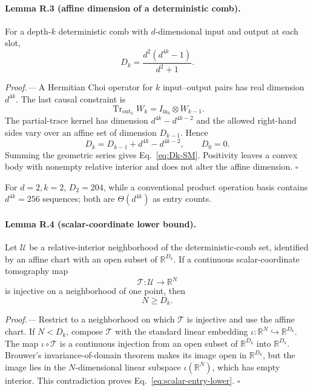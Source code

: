 \documentclass[aps,prl,onecolumn,superscriptaddress,nofootinbib]{revtex4-2}
\newcommand{\R}{\mathbb R}
\newcommand{\Tr}{\operatorname{Tr}}
\begin{document}
\paragraph{Lemma R.3 (affine dimension of a deterministic comb).}
For a depth-$k$ deterministic comb with $d$-dimensional input and output at each slot,
\begin{equation}
 D_k=\frac{d^2(d^{4k}-1)}{d^2+1}.
 \label{eq:Dk-SM}
\end{equation}

\emph{Proof.---}
A Hermitian Choi operator for $k$ input--output pairs has real dimension $d^{4k}$.  The last causal constraint is
\begin{equation}
 \Tr_{\mathrm{out}_k}W_k=I_{\mathrm{in}_k}\otimes W_{k-1}.
 \label{eq:comb-causal}
\end{equation}
The partial-trace kernel has dimension $d^{4k}-d^{4k-2}$ and the allowed right-hand sides vary over an affine set of dimension $D_{k-1}$.  Hence
\begin{equation}
 D_k=D_{k-1}+d^{4k}-d^{4k-2},
 \qquad D_0=0.
 \label{eq:Drecurrence}
\end{equation}
Summing the geometric series gives Eq.~\eqref{eq:Dk-SM}.  Positivity leaves a convex body with nonempty relative interior and does not alter the affine dimension. \hfill$\square$

For $d=2,k=2$, $D_2=204$, while a conventional product operation basis contains $d^{4k}=256$ sequences; both are $\Theta(d^{4k})$ as entry counts.

\paragraph{Lemma R.4 (scalar-coordinate lower bound).}
Let $\mathcal U$ be a relative-interior neighborhood of the deterministic-comb set, identified by an affine chart with an open subset of $\R^{D_k}$.  If a continuous scalar-coordinate tomography map
\begin{equation}
 \mathcal T:\mathcal U\longrightarrow\R^N
 \label{eq:scalar-tomography-map}
\end{equation}
is injective on a neighborhood of one point, then
\begin{equation}
 N\ge D_k.
 \label{eq:scalar-entry-lower}
\end{equation}

\emph{Proof.---}
Restrict to a neighborhood on which $\mathcal T$ is injective and use the affine chart.  If $N<D_k$, compose $\mathcal T$ with the standard linear embedding $\iota:\R^N\hookrightarrow\R^{D_k}$.  The map $\iota\circ\mathcal T$ is a continuous injection from an open subset of $\R^{D_k}$ into $\R^{D_k}$.  Brouwer's invariance-of-domain theorem makes its image open in $\R^{D_k}$, but the image lies in the $N$-dimensional linear subspace $\iota(\R^N)$, which has empty interior.  This contradiction proves Eq.~\eqref{eq:scalar-entry-lower}. \hfill$\square$
\end{document}
